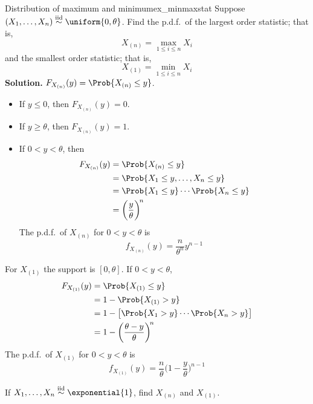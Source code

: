 \begin{Example}{Distribution of maximum and minimum}{ex_minmaxstat}
    Suppose $ (X_1,\ldots,X_n)\stackrel{\text{iid}}{\sim}\uniform{0,\theta} $.
    Find the p.d.f.\ of the largest order statistic; that is,
    \[ X_{(n)}=\max_{1\le i\le n} X_i \]
    and the smallest order statistic; that is,
    \[ X_{(1)}=\min_{1\le i\le n}X_i \]
    \textbf{Solution.} $ F_{X_{(n)}}(y)=\Prob{X_{(n)}\le y} $.
    \begin{itemize}
        \item If $ y\le 0 $, then $ F_{X_{(n)}}(y)=0 $.
        \item If $ y\ge \theta $, then $ F_{X_{(n)}}(y)=1 $.
        \item If $ 0<y<\theta $, then
              \begin{align*}
                  F_{X_{(n)}}(y)
                   & =\Prob{X_{(n)}\le y}                    \\
                   & =\Prob{X_1\le y,\ldots,X_n\le y}        \\
                   & =\Prob{X_1\le y}\cdots\Prob{X_n\le y}   \\
                   & =\biggl( \frac{y}{\theta} \biggr)^{\!n}
              \end{align*}
              The p.d.f.\ of $ X_{(n)} $ for $ 0<y<\theta $ is
              \[ f_{X_{(n)}}(y)=\frac{n}{\theta^n}y^{n-1} \]
    \end{itemize}
    For $ X_{(1)} $ the support is $ [0,\theta] $. If $ 0<y<\theta $,
    \begin{align*}
        F_{X_{(1)}}(y)
         & =\Prob{X_{(1)}\le y}                              \\
         & =1-\Prob{X_{(1)}>y}                               \\
         & =1-\bigl[ \Prob{X_1>y}\cdots \Prob{X_n>y} \bigr]  \\
         & =1-\biggl( \frac{\theta-y}{\theta}  \biggr)^{\!n}
    \end{align*}
    The p.d.f.\ of $ X_{(1)} $ for $ 0<y<\theta $ is
    \[ f_{X_{(1)}}(y)=\frac{n}{\theta} \biggl( 1-\frac{y}{\theta}  \biggr)^{\!n-1} \]
\end{Example}
\begin{Exercise}{}{}
    If $ X_1,\ldots,X_n \stackrel{\text{iid}}{\sim} \exponential{1} $,
    find $ X_{(n)} $ and $ X_{(1)} $.
\end{Exercise}

